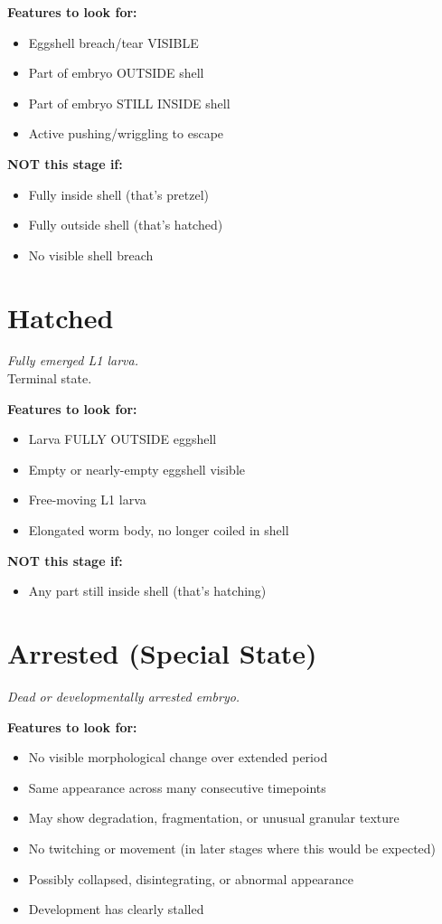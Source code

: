 \documentclass[11pt,letterpaper]{article}
\begin{document}
\textbf{Features to look for:}
\begin{itemize}
    \item Eggshell breach/tear VISIBLE
    \item Part of embryo OUTSIDE shell
    \item Part of embryo STILL INSIDE shell
    \item Active pushing/wriggling to escape
\end{itemize}

\textbf{NOT this stage if:}
\begin{itemize}
    \item Fully inside shell (that's pretzel)
    \item Fully outside shell (that's hatched)
    \item No visible shell breach
\end{itemize}

\section{Hatched}
\textit{Fully emerged L1 larva.}\\
Terminal state.

\textbf{Features to look for:}
\begin{itemize}
    \item Larva FULLY OUTSIDE eggshell
    \item Empty or nearly-empty eggshell visible
    \item Free-moving L1 larva
    \item Elongated worm body, no longer coiled in shell
\end{itemize}

\textbf{NOT this stage if:}
\begin{itemize}
    \item Any part still inside shell (that's hatching)
\end{itemize}

\section{Arrested (Special State)}
\textit{Dead or developmentally arrested embryo.}

\textbf{Features to look for:}
\begin{itemize}
    \item No visible morphological change over extended period
    \item Same appearance across many consecutive timepoints
    \item May show degradation, fragmentation, or unusual granular texture
    \item No twitching or movement (in later stages where this would be expected)
    \item Possibly collapsed, disintegrating, or abnormal appearance
    \item Development has clearly stalled
\end{itemize}
\end{document}
